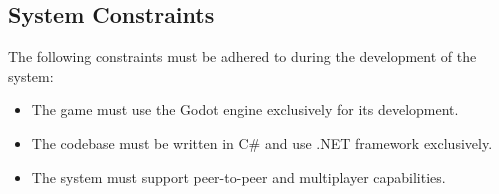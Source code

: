\subsection{System Constraints}

\noindent The following constraints must be adhered to during the development of the system:
  \begin{itemize}
    \item The game must use the Godot engine exclusively for its development.
    \item The codebase must be written in C\# and  use .NET framework exclusively.
    \item The system must support peer-to-peer and multiplayer capabilities.
  \end{itemize}